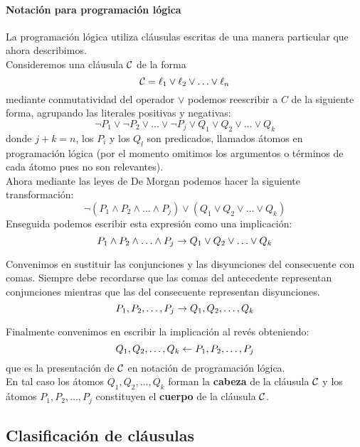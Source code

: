 \documentclass[11pt,letterpaper]{article}
\begin{document}
\paragraph{Notaci\'on para programaci\'on l\'ogica}
La programaci\'on l\'ogica utiliza cl\'ausulas escritas de una manera
particular que ahora describimos.\\
Consideremos una cl\'ausula $\mathcal{C}$ de la forma 
$$ \mathcal{C}=\ell_1\lor \ell_2\lor\ldots\lor \ell_n $$
mediante conmutatividad del operador $\lor$ podemos reescribir a $C$ de la 
siguiente forma, agrupando las literales positivas y negativas:
$$ 
\neg P_1\lor\neg P_2\lor\ldots\lor \neg P_j\lor Q_1\lor Q_2\lor\ldots\lor Q_k
$$
donde $j+k=n$, los $P_i$ y los $Q_l$ son predicados, llamados \'atomos
en programaci\'on l\'ogica (por el momento omitimos
los argumentos o t\'erminos de cada \'atomo pues no son relevantes).\\
Ahora mediante las leyes de De Morgan podemos hacer la siguiente
transformaci\'on:
$$
\neg (P_1\land P_2\land\ldots\land P_j) \lor (Q_1\lor Q_2\lor\ldots\lor Q_k)
$$
\noindent Enseguida podemos escribir esta expresi\'on como una implicaci\'on:
$$
P_1\land P_2\land\ldots\land P_j \rightarrow Q_1\lor Q_2\lor\ldots\lor Q_k
$$

\noindent Convenimos en  sustituir las conjunciones y las disyunciones del 
consecuente con comas. Siempre debe recordarse que las comas del antecedente 
representan conjunciones mientras que las del consecuente representan 
disyunciones. 
$$
P_1, P_2,\ldots, P_j \rightarrow Q_1, Q_2,\ldots, Q_k
$$

\noindent Finalmente convenimos en escribir la implicaci\'on al revés obteniendo:
$$
Q_1,Q_2,\ldots, Q_k \leftarrow P_1, P_2,\ldots, P_j
$$
\noindent que es la presentaci\'on de $\mathcal{C}$ en notaci\'on de programaci\'on 
l\'ogica. \\
En tal caso los \'atomos $Q_1,Q_2,\ldots,Q_k$ forman la \textbf{cabeza} de la
cl\'ausula $\mathcal{C}$ y los \'atomos $P_1,P_2,\ldots, P_j$ constituyen el
\textbf{cuerpo} de la cl\'ausula $\mathcal{C}$.


\subsection{Clasificaci\'on de cl\'ausulas}
\end{document}
